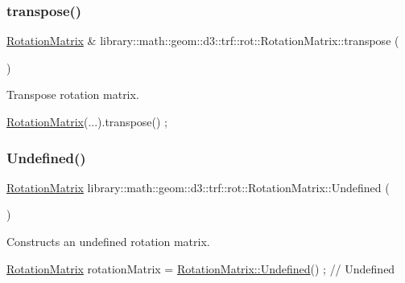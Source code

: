 \subsubsection{\texorpdfstring{transpose()}{transpose()}}
{\footnotesize\ttfamily \hyperlink{classlibrary_1_1math_1_1geom_1_1d3_1_1trf_1_1rot_1_1_rotation_matrix}{Rotation\+Matrix} \& library\+::math\+::geom\+::d3\+::trf\+::rot\+::\+Rotation\+Matrix\+::transpose (\begin{DoxyParamCaption}{ }\end{DoxyParamCaption})}



Transpose rotation matrix. 


\begin{DoxyCode}
\hyperlink{classlibrary_1_1math_1_1geom_1_1d3_1_1trf_1_1rot_1_1_rotation_matrix_a7f1184694020cb4f963d58931324ab06}{RotationMatrix}(...).transpose() ;
\end{DoxyCode}
 \mbox{\label{classlibrary_1_1math_1_1geom_1_1d3_1_1trf_1_1rot_1_1_rotation_matrix_a959b34738200815ce55874c17ea6b7a6}} 
\subsubsection{\texorpdfstring{Undefined()}{Undefined()}}
{\footnotesize\ttfamily \hyperlink{classlibrary_1_1math_1_1geom_1_1d3_1_1trf_1_1rot_1_1_rotation_matrix}{Rotation\+Matrix} library\+::math\+::geom\+::d3\+::trf\+::rot\+::\+Rotation\+Matrix\+::\+Undefined (\begin{DoxyParamCaption}{ }\end{DoxyParamCaption})\hspace{0.3cm}{\ttfamily [static]}}



Constructs an undefined rotation matrix. 


\begin{DoxyCode}
\hyperlink{classlibrary_1_1math_1_1geom_1_1d3_1_1trf_1_1rot_1_1_rotation_matrix_a7f1184694020cb4f963d58931324ab06}{RotationMatrix} rotationMatrix = \hyperlink{classlibrary_1_1math_1_1geom_1_1d3_1_1trf_1_1rot_1_1_rotation_matrix_a959b34738200815ce55874c17ea6b7a6}{RotationMatrix::Undefined}() ; \textcolor{comment}{//
       Undefined}
\end{DoxyCode}



